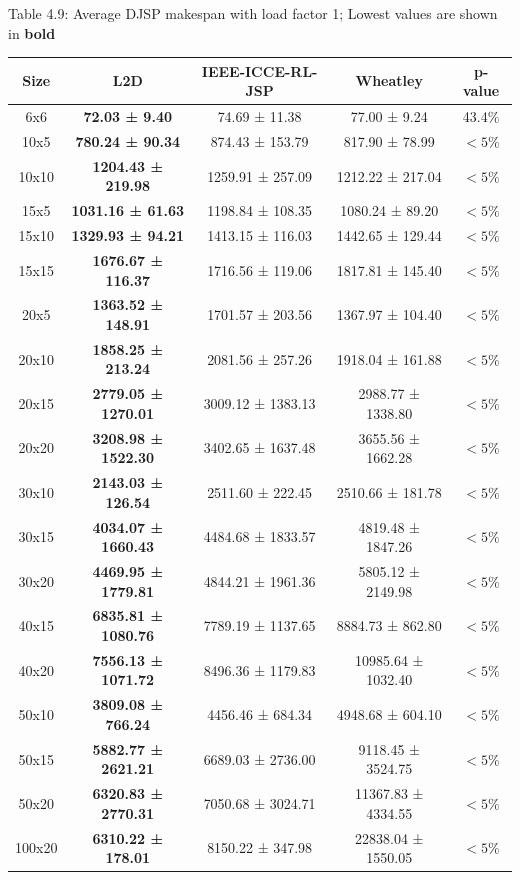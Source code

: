 \begin{table}
    Table 4.9: Average DJSP makespan with load factor 1; Lowest values are shown in \textbf{bold}\\
    \vspace{1mm}
    \label{table:4.6}
    \footnotesize 
    \begin{tabular}{ccccc}
        \toprule
        Size & L2D & IEEE-ICCE-RL-JSP & Wheatley & p-value \\
        \midrule
        6x6 & \textbf{72.03 ± 9.40} & 74.69 ± 11.38 & 77.00 ± 9.24 & 43.4$\%$ \\
        10x5 & \textbf{780.24 ± 90.34} & 874.43 ± 153.79 & 817.90 ± 78.99 & $< 5\%$ \\
        10x10 & \textbf{1204.43 ± 219.98} & 1259.91 ± 257.09 & 1212.22 ± 217.04 & $< 5\%$ \\
        15x5 & \textbf{1031.16 ± 61.63} & 1198.84 ± 108.35 & 1080.24 ± 89.20 & $< 5\%$ \\
        15x10 & \textbf{1329.93 ± 94.21} & 1413.15 ± 116.03 & 1442.65 ± 129.44 & $< 5\%$ \\
        15x15 & \textbf{1676.67 ± 116.37} & 1716.56 ± 119.06 & 1817.81 ± 145.40 & $< 5\%$ \\
        20x5 & \textbf{1363.52 ± 148.91} & 1701.57 ± 203.56 & 1367.97 ± 104.40 & $< 5\%$ \\
        20x10 & \textbf{1858.25 ± 213.24} & 2081.56 ± 257.26 & 1918.04 ± 161.88 & $< 5\%$ \\
        20x15 & \textbf{2779.05 ± 1270.01} & 3009.12 ± 1383.13 & 2988.77 ± 1338.80 & $< 5\%$ \\
        20x20 & \textbf{3208.98 ± 1522.30} & 3402.65 ± 1637.48 & 3655.56 ± 1662.28 & $< 5\%$ \\
        30x10 & \textbf{2143.03 ± 126.54} & 2511.60 ± 222.45 & 2510.66 ± 181.78 & $< 5\%$ \\
        30x15 & \textbf{4034.07 ± 1660.43} & 4484.68 ± 1833.57 & 4819.48 ± 1847.26 & $< 5\%$ \\
        30x20 & \textbf{4469.95 ± 1779.81} & 4844.21 ± 1961.36 & 5805.12 ± 2149.98 & $< 5\%$ \\
        40x15 & \textbf{6835.81 ± 1080.76} & 7789.19 ± 1137.65 & 8884.73 ± 862.80 & $< 5\%$ \\
        40x20 & \textbf{7556.13 ± 1071.72} & 8496.36 ± 1179.83 & 10985.64 ± 1032.40 & $< 5\%$ \\
        50x10 & \textbf{3809.08 ± 766.24} & 4456.46 ± 684.34 & 4948.68 ± 604.10 & $< 5\%$ \\
        50x15 & \textbf{5882.77 ± 2621.21} & 6689.03 ± 2736.00 & 9118.45 ± 3524.75 & $< 5\%$ \\
        50x20 & \textbf{6320.83 ± 2770.31} & 7050.68 ± 3024.71 & 11367.83 ± 4334.55 & $< 5\%$ \\
        100x20 & \textbf{6310.22 ± 178.01} & 8150.22 ± 347.98 & 22838.04 ± 1550.05 & $< 5\%$ \\
        \bottomrule
    \end{tabular}
\end{table}
    

